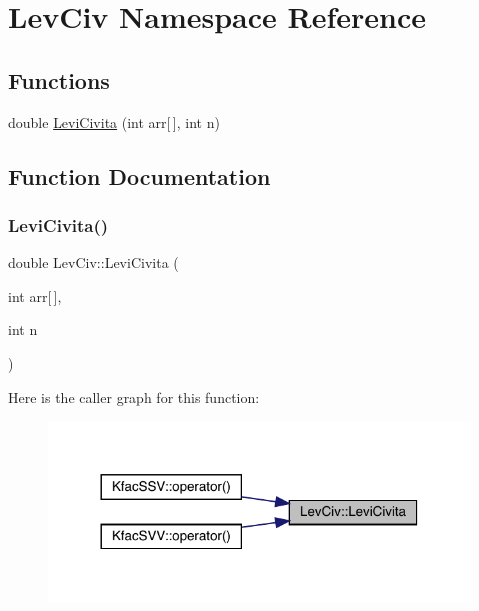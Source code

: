 \hypertarget{namespaceLevCiv}{}\section{Lev\+Civ Namespace Reference}
\label{namespaceLevCiv}
\subsection*{Functions}
\begin{DoxyCompactItemize}
\item 
double \mbox{\hyperlink{namespaceLevCiv_adf1ae0fe71d3a8851d6ec4bd21ef4907}{Levi\+Civita}} (int arr\mbox{[}$\,$\mbox{]}, int n)
\end{DoxyCompactItemize}


\subsection{Function Documentation}
\mbox{\label{namespaceLevCiv_adf1ae0fe71d3a8851d6ec4bd21ef4907}} 
\subsubsection{\texorpdfstring{LeviCivita()}{LeviCivita()}}
{\footnotesize\ttfamily double Lev\+Civ\+::\+Levi\+Civita (\begin{DoxyParamCaption}\item[{int}]{arr\mbox{[}$\,$\mbox{]},  }\item[{int}]{n }\end{DoxyParamCaption})}

Here is the caller graph for this function\+:
\nopagebreak
\begin{figure}[H]
\begin{center}
\leavevmode
\includegraphics[width=317pt]{d3/df8/namespaceLevCiv_adf1ae0fe71d3a8851d6ec4bd21ef4907_icgraph}
\end{center}
\end{figure}
